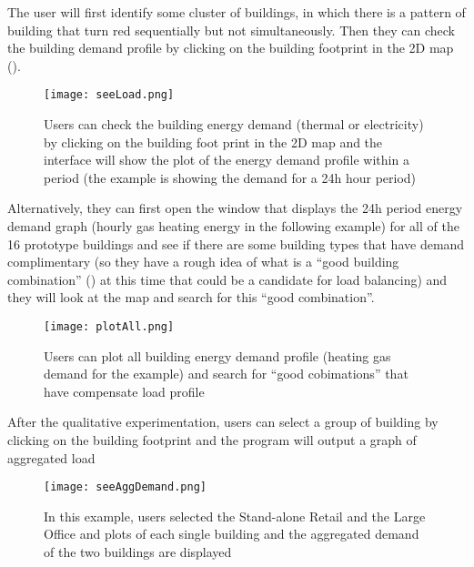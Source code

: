 \begin{itemize}
  The user will first identify some cluster of buildings, in which
  there is a pattern of building that turn red sequentially but not
  simultaneously. Then they can check the building demand profile by
  clicking on the building footprint in the 2D map
  ().

  \begin{figure}[h!]
    \centering
    \texttt{[image: seeLoad.png]}
    \caption[Check Heating Load]{Users can check the building energy
      demand (thermal or electricity) by clicking on the building foot
      print in the 2D map and the interface will show the plot of the
      energy demand profile within a period (the example is showing
      the demand for a 24h hour period)}
    \label{fig:seeLoad}
  \end{figure}

  Alternatively, they can first open the window that displays the 24h
  period energy demand graph (hourly gas heating energy in the
  following example) for all of the 16 prototype buildings and see if
  there are some building types that have demand complimentary (so
  they have a rough idea of what is a ``good building combination''
  () at this time that could be a candidate for load
  balancing) and they will look at the map and search for this ``good
  combination''.

  \begin{figure}[h!]
    \centering
    \texttt{[image: plotAll.png]}
    \caption[Check All Heating Load Plot]{Users can plot all building
      energy demand profile (heating gas demand for the example) and
      search for ``good cobimations'' that have compensate load
      profile}
    \label{fig:plotAll}
  \end{figure}

  After the qualitative experimentation, users can select a group of
  building by clicking on the building footprint and the program will
  output a graph of aggregated load

  \begin{figure}[h!]
    \centering
    \texttt{[image: seeAggDemand.png]}
    \caption[Plot Aggregated Demand]{In this example, users selected
      the Stand-alone Retail and the Large Office and plots of each
      single building and the aggregated demand of the two buildings
      are displayed}
    \label{fig:seeAggDemand}
  \end{figure}

\end{itemize}


